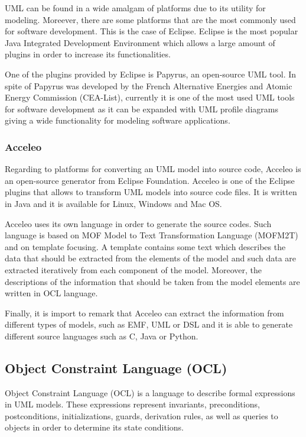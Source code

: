 UML can be found in a wide amalgam of platforms due to its utility for modeling. Moreever, there are some platforms that are the most commonly used for software development. This is the case of Eclipse.  Eclipse is the most popular Java Integrated Development Environment which allows a large amount of plugins in order to increase its functionalities.

One of the plugins provided by Eclipse is Papyrus, an open-source UML tool. In spite of Papyrus was developed by the French Alternative Energies and Atomic Energy Commission (CEA-List), currently it is one of the most used UML tools for software development as it can be expanded with UML profile diagrams giving a wide functionality for modeling software applications.

\subsubsection*{Acceleo}

Regarding to platforms for converting an UML model into source code, Acceleo is an open-source generator from Eclipse Foundation. Acceleo is
one of the Eclipse plugins that allows to transform UML models into source code files. It is written in Java and it is available for Linux, Windows and Mac OS.

Acceleo uses its own language in order to generate the source codes. Such language is based on MOF Model to Text Transformation Language (MOFM2T) and on template focusing. A template contains some text which describes the data that should be extracted from the elements of the model and such data are extracted iteratively from each component of the model. Moreover, the descriptions of the information that should be taken from the model elements are written in OCL language.

Finally, it is import to remark that Acceleo can extract the information from different types of models, such as EMF, UML or DSL and it is able to generate different source languages such as C, Java or Python.

\subsection{Object Constraint Language (OCL)}

Object Constraint Language (OCL) is a language to describe formal expressions in UML models. These expressions represent invariants, preconditions, postconditions, initializations, guards, derivation rules, as well as queries to objects in order to determine its state conditions. 

